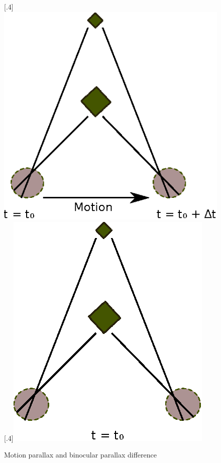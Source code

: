 \begin{figure}[!h]
\centering
{}
[.4\linewidth]{\includegraphics{Mparallax}}%
[.4\linewidth]{\includegraphics{Bparallax}}%
\caption{Motion parallax and binocular parallax difference}
\label{fig:parallax}
\end{figure}

%
%

